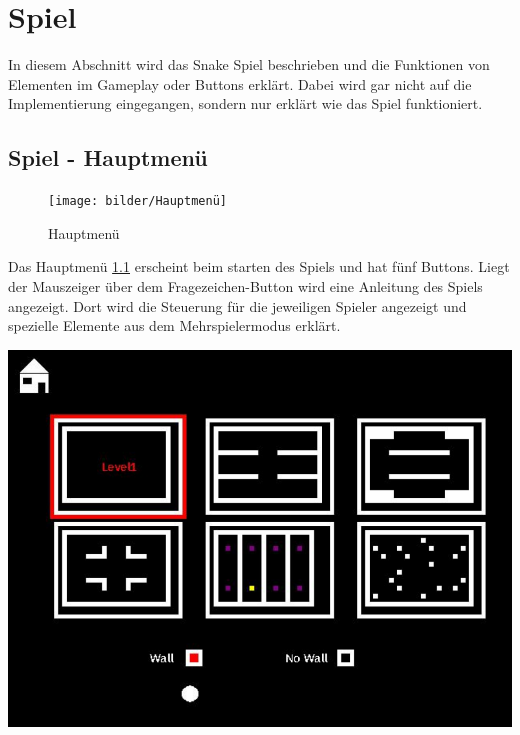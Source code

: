 \chapter{Spiel}
\label{Spiel}
%
In diesem Abschnitt wird das Snake Spiel beschrieben und die Funktionen von Elementen im Gameplay oder Buttons erklärt. Dabei wird gar nicht auf die Implementierung eingegangen, sondern nur erklärt wie das Spiel funktioniert.


\section{Spiel - Hauptmenü}
\label{Spiel_-_Hauptmenü}
%
\begin{figure}[h]
 \centering
 \texttt{[image: bilder/Hauptmenü]}
 \caption{Hauptmenü}
 \label{fig:hauptmenü}
\end{figure}
Das Hauptmenü \ref{fig:hauptmenü} erscheint beim starten des Spiels und hat fünf Buttons. Liegt der Mauszeiger über dem Fragezeichen-Button wird eine Anleitung des Spiels angezeigt. Dort wird die Steuerung für die jeweiligen Spieler angezeigt und spezielle Elemente aus dem Mehrspielermodus erklärt.\\
\begin{minipage}[X]{1.1\textwidth}
 \centering
 \includegraphics[scale=0.5]{bilder/Einstellungen}
 \label{fig:einstellungen}
\end{minipage}
